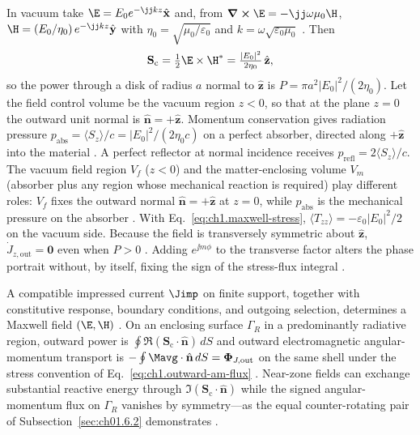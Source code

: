 In vacuum take
$\E=E_0 e^{-\jj k z}\hat{\mathbf{x}}$ and, from $\curl\E=-\jj\omega\mu_0\H$,
$\H=(E_0/\eta_0)\,e^{-\jj k z}\hat{\mathbf{y}}$ with
$\eta_0=\sqrt{\mu_0/\varepsilon_0}$ and $k=\omega\sqrt{\varepsilon_0\mu_0}$
\cite{stratton1941}. Then
\begin{equation}
\label{eq:ch1.intro-plane-wave-preview}
\mathbf{S}_\mathrm{c}=\tfrac12\E\times\H^*=\tfrac{|E_0|^2}{2\eta_0}\,\hat{\mathbf{z}},
\end{equation}
so the power through a disk of radius $a$ normal to $\hat{\mathbf{z}}$ is
$P=\pi a^2 |E_0|^2/(2\eta_0)$. Let the field control volume be the vacuum region
$z<0$, so that at the plane $z=0$ the outward unit normal is $\hat{\mathbf{n}}=+\hat{\mathbf{z}}$.
Momentum conservation gives radiation pressure $p_{\mathrm{abs}}=\langle S_z\rangle/c=
|E_0|^2/(2\eta_0 c)$ on a perfect absorber, directed along $+\hat{\mathbf{z}}$ into the
material \cite{stratton1941}. A perfect reflector at normal incidence receives
$p_{\mathrm{refl}}=2\langle S_z\rangle/c$. The vacuum field region $V_f$ ($z<0$) and the matter-enclosing volume $V_m$ (absorber plus any region whose mechanical reaction is required) play different roles: $V_f$ fixes the outward normal $\hat{\mathbf{n}}=+\hat{\mathbf{z}}$ at $z=0$, while $p_{\mathrm{abs}}$ is the mechanical pressure on the absorber \cite{maxwell1873,stratton1941}. With Eq.~\eqref{eq:ch1.maxwell-stress}, $\langle T_{zz}\rangle=-\varepsilon_0|E_0|^2/2$ on the vacuum side. Because the field is transversely symmetric
about $\hat{\mathbf{z}}$, $\dot J_{z,\mathrm{out}}=\mathbf{0}$ even
when $P>0$ \cite{beth1936}. Adding $e^{\jj m\phi}$ to the transverse factor alters the
phase portrait without, by itself, fixing the sign of the stress-flux integral
\cite{allen1992,stratton1941}.

A compatible impressed current $\Jimp$ on finite support, together with constitutive
response, boundary conditions, and outgoing selection, determines a Maxwell field
$(\E,\H)$ \cite{maxwell1873,stratton1941}. On an enclosing surface $\Gamma_R$ in
a predominantly radiative region, outward power is
$\oint \Re(\mathbf{S}_\mathrm{c}\cdot\hat{\mathbf{n}})\,dS$ and outward electromagnetic angular-momentum transport is
$-\oint \Mavg\cdot\hat{\mathbf{n}}\,dS=\boldsymbol{\Phi}_{J,\mathrm{out}}$ on the same shell under the stress convention of Eq.~\eqref{eq:ch1.outward-am-flux} \cite{beth1936}.
Near-zone fields can exchange substantial reactive energy through
$\Im(\mathbf{S}_\mathrm{c}\cdot\hat{\mathbf{n}})$ while the signed angular-momentum flux on
$\Gamma_R$ vanishes by symmetry---as the equal counter-rotating pair of
Subsection~\ref{sec:ch01.6.2} demonstrates \cite{allen1992}.

